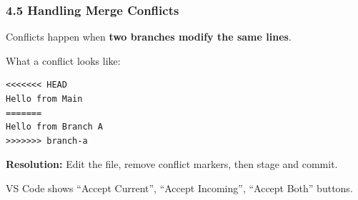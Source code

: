 \documentclass{beamer}
\begin{document}
\begin{frame}[fragile]
\frametitle{4.5 Handling Merge Conflicts}

Conflicts happen when \textbf{two branches modify the same lines}.

\vspace{1mm}
What a conflict looks like:
\begin{lstlisting}
<<<<<<< HEAD
Hello from Main
=======
Hello from Branch A
>>>>>>> branch-a
\end{lstlisting}

\small\textbf{Resolution:} Edit the file, remove conflict markers, then stage and commit.\vspace{1mm}

\small VS Code shows ``Accept Current'', ``Accept Incoming'', ``Accept Both'' buttons.
\end{frame}

\end{document}
